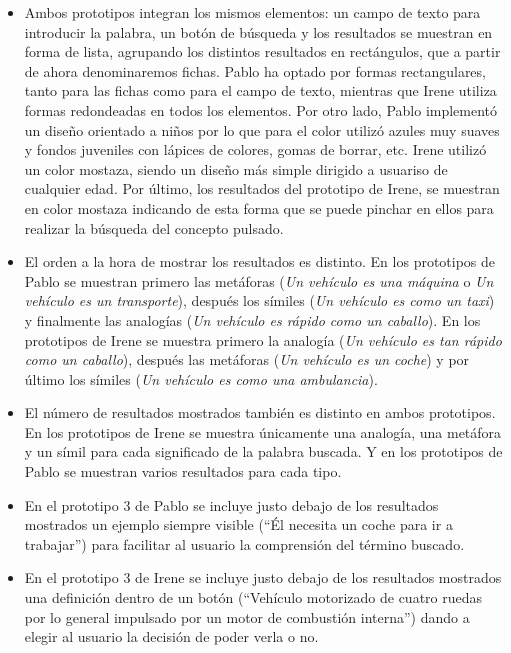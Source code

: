\begin{itemize}
	\item Ambos prototipos integran los mismos elementos: un campo de texto para introducir la palabra, un botón de búsqueda y los resultados se muestran en forma de lista, agrupando los distintos resultados en rectángulos, que a partir de ahora denominaremos fichas.
	Pablo ha optado por formas rectangulares, tanto para las fichas como para el campo de texto, mientras que Irene utiliza formas redondeadas en todos los elementos. 
	Por otro lado, Pablo implementó un diseño orientado a niños por lo que para el color utilizó azules muy suaves y fondos juveniles con lápices de colores, gomas de borrar, etc.  Irene utilizó un color mostaza, siendo un diseño más simple dirigido a usuariso de cualquier edad. Por último, los resultados del prototipo de Irene, se muestran en color mostaza indicando de esta forma que se puede pinchar en ellos para realizar la búsqueda del concepto pulsado.
	
	\item El orden a la hora de mostrar los resultados es distinto. En los prototipos de Pablo se muestran primero las metáforas (\textit{Un vehículo es una máquina} o \textit{Un vehículo es un transporte}), después los símiles (\textit{Un vehículo es como un taxi}) y finalmente las analogías (\textit{Un vehículo es rápido como un caballo}). En los prototipos de Irene se muestra primero la analogía (\textit{Un vehículo es tan rápido como un caballo}), después las metáforas (\textit{Un vehículo es un coche}) y por último los símiles (\textit{Un vehículo es como una ambulancia}).
	
	\item El número de resultados mostrados también es distinto en ambos prototipos. En los prototipos de Irene se muestra únicamente una analogía, una metáfora y un símil para cada significado de la palabra buscada. Y en los prototipos de Pablo se muestran varios resultados para cada tipo.
	
	\item En el prototipo 3 de Pablo se incluye justo debajo de los resultados mostrados un ejemplo siempre visible (``Él necesita un coche para ir a trabajar'') para facilitar al usuario la comprensión del término buscado.
	
	 \item En el prototipo 3 de Irene se incluye justo debajo de los resultados mostrados una definición dentro de un botón (``Vehículo motorizado de cuatro ruedas por lo general impulsado por un motor de combustión interna'') dando a elegir al usuario la decisión de poder verla o no.
	

\end{itemize}
